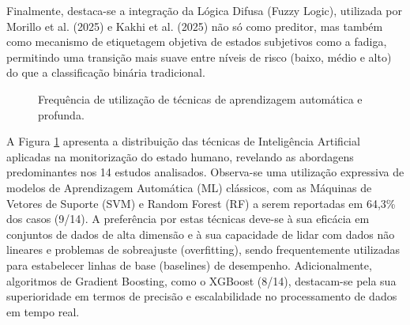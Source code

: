 Finalmente, destaca-se a integração da Lógica Difusa (Fuzzy Logic), utilizada por Morillo et al. (2025) e Kakhi et al. (2025)\cite{albarran2025,kakhi2025} não só como preditor, mas também como mecanismo de etiquetagem objetiva de estados subjetivos como a fadiga, permitindo uma transição mais suave entre níveis de risco (baixo, médio e alto) do que a classificação binária tradicional.

\begin{figure}[H]
\centering
{}
\caption{Frequência de utilização de técnicas de aprendizagem automática e profunda.}
\label{fig:tecnicas_ia}
\end{figure}

A Figura \ref{fig:tecnicas_ia} apresenta a distribuição das técnicas de Inteligência Artificial aplicadas na monitorização do estado humano, revelando as abordagens predominantes nos 14 estudos analisados. Observa-se uma utilização expressiva de modelos de Aprendizagem Automática (ML) clássicos, com as Máquinas de Vetores de Suporte (SVM) e Random Forest (RF) a serem reportadas em 64,3\% dos casos (9/14). A preferência por estas técnicas deve-se à sua eficácia em conjuntos de dados de alta dimensão e à sua capacidade de lidar com dados não lineares e problemas de sobreajuste (overfitting), sendo frequentemente utilizadas para estabelecer linhas de base (baselines) de desempenho. Adicionalmente, algoritmos de Gradient Boosting, como o XGBoost (8/14), destacam-se pela sua superioridade em termos de precisão e escalabilidade no processamento de dados em tempo real.

